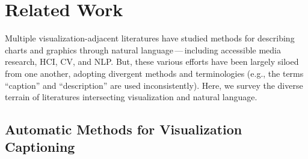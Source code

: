 \section{Related Work}
\label{section:2}

\acresetall %

Multiple visualization-adjacent literatures have studied methods for describing charts and graphics through natural language\,---\,including accessible media research, \ac{HCI}, \ac{CV}, and \ac{NLP}. But, these various efforts have been largely siloed from one another, adopting divergent methods and terminologies (e.g., the terms ``caption'' and ``description'' are used inconsistently).
Here, we survey the diverse terrain of literatures intersecting visualization and natural language.

\subsection{Automatic Methods for Visualization Captioning}

